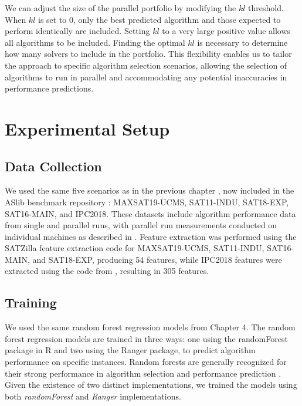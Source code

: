 We can adjust the size of the parallel portfolio by modifying the $kl$ threshold. When $kl$ is set to 0, only the best predicted algorithm and those expected to perform identically are included. Setting $kl$ to a very large positive value allows all algorithms to be included. Finding the optimal $kl$ is necessary to determine how many solvers to include in the portfolio. This flexibility enables us to tailor the approach to specific algorithm selection scenarios, allowing the selection of algorithms to run in parallel and accommodating any potential inaccuracies in performance predictions.

\section{Experimental Setup}
\subsection{Data Collection}

We used the same five scenarios as in the previous chapter \cite{kashgarani2023automatic}, now included in the ASlib benchmark repository \cite{BISCHL201641}: MAXSAT19-UCMS, SAT11-INDU, SAT18-EXP, SAT16-MAIN, and IPC2018. These datasets include algorithm performance data from single and parallel runs, with parallel run measurements conducted on individual machines as described in \cite{kashgarani2023automatic}. Feature extraction was performed using the SATZilla feature extraction code for MAXSAT19-UCMS, SAT11-INDU, SAT16-MAIN, and SAT18-EXP, producing 54 features, while IPC2018 features were extracted using the code from \cite{Fawcett_Vallati_Hutter_Hoffmann_Hoos_Leyton-Brown_2014}, resulting in 305 features.

\subsection{Training}
We used the same random forest regression models from Chapter 4. The random forest regression models are trained in three ways: one using the randomForest package in R and two using the Ranger package, to predict algorithm performance on specific instances. Random forests are generally recognized for their strong performance in algorithm selection and performance prediction \cite{BISCHL201641,HUTTER201479}. Given the existence of two distinct implementations, we trained the models using both \textit{randomForest} and \textit{Ranger} implementations.

